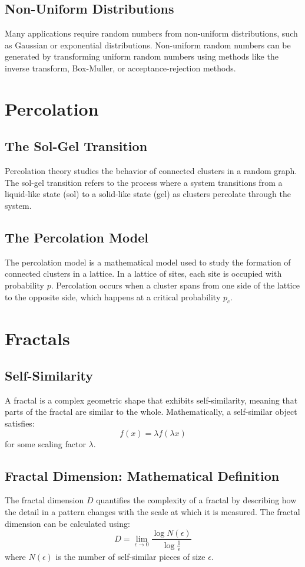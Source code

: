 \documentclass[12pt]{article}
\begin{document}
\subsection{Non-Uniform Distributions}
Many applications require random numbers from non-uniform distributions, such as Gaussian or exponential distributions. Non-uniform random numbers can be generated by transforming uniform random numbers using methods like the inverse transform, Box-Muller, or acceptance-rejection methods.

\section{Percolation}
\subsection{The Sol-Gel Transition}
Percolation theory studies the behavior of connected clusters in a random graph. The sol-gel transition refers to the process where a system transitions from a liquid-like state (sol) to a solid-like state (gel) as clusters percolate through the system.

\subsection{The Percolation Model}
The percolation model is a mathematical model used to study the formation of connected clusters in a lattice. In a lattice of sites, each site is occupied with probability \( p \). Percolation occurs when a cluster spans from one side of the lattice to the opposite side, which happens at a critical probability \( p_c \).

\section{Fractals}
\subsection{Self-Similarity}
A fractal is a complex geometric shape that exhibits self-similarity, meaning that parts of the fractal are similar to the whole. Mathematically, a self-similar object satisfies:
\[
f(x) = \lambda f(\lambda x)
\]
for some scaling factor \( \lambda \).

\subsection{Fractal Dimension: Mathematical Definition}
The fractal dimension \( D \) quantifies the complexity of a fractal by describing how the detail in a pattern changes with the scale at which it is measured. The fractal dimension can be calculated using:
\[
D = \lim_{\epsilon \to 0} \frac{\log N(\epsilon)}{\log \frac{1}{\epsilon}}
\]
where \( N(\epsilon) \) is the number of self-similar pieces of size \( \epsilon \).
\end{document}
